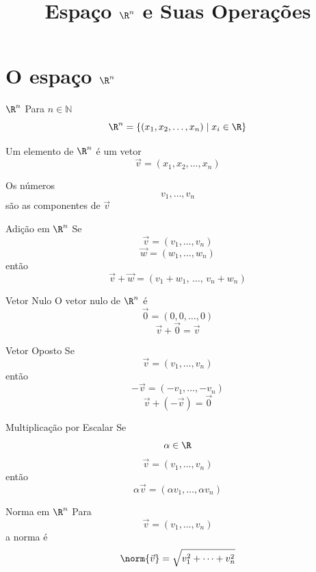 \documentclass[fleqn,aspectratio=169,12pt]{beamer}
\title{Espaço $\R^n$ e Suas Operações}
\begin{document}
\addtitle

\section{O espaço $\R^n$}

\begin{frame}{$\R^n$}
  Para $n\in\mathbb{N}$
  \[
    \R^n = \left\{ (x_1, x_2, \ldots, x_n) \mid x_i\in\R \right\}
  \]

  Um elemento de $\R^n$ é um vetor
  \[
    \vec{v} = (x_1, x_2, \ldots, x_n)
  \]

  Os números
  \[
    v_1, \ldots, v_n
  \]
  são as componentes de $\vec{v}$
\end{frame}

\begin{frame}{Adição em $\R^n$}
  Se
  \[
    \vec{v} = (v_1, \ldots, v_n)
  \]
  \[
    \vec{w} = (w_1, \ldots, w_n)
  \]
  então
  \[
    \vec{v} + \vec{w} = ( v_1+w_1,\, \ldots,\, v_n+w_n )
  \]
\end{frame}

\begin{frame}{Vetor Nulo}
  O vetor nulo de $\R^n$ é
  \[
    \vec{0} = (0, 0, \ldots, 0)
  \]
  \[
    \vec{v}+\vec{0} = \vec{v}
  \]
\end{frame}

\begin{frame}{Vetor Oposto}
  Se
  \[
    \vec{v} = (v_1, \ldots, v_n)
  \]
  então
  \[
    -\vec{v} = (-v_1, \ldots, -v_n)
  \]
  \[
    \vec{v}+(-\vec{v}) = \vec{0}
  \]
\end{frame}

\begin{frame}{Multiplicação por Escalar}
  Se
  \[
    \alpha\in\R
  \]
  \[
    \vec{v} = (v_1, \ldots, v_n)
  \]
  então
  \[
    \alpha\vec{v} = (\alpha v_1, \ldots, \alpha v_n)
  \]
\end{frame}

\begin{frame}{Norma em $\R^n$}
  Para
  \[
    \vec{v} = (v_1, \ldots, v_n)
  \]
  a norma é
  \[
    \norm{\vec{v}} = \sqrt{ v_1^2 + \cdots + v_n^2}
  \]
\end{frame}
\end{document}
